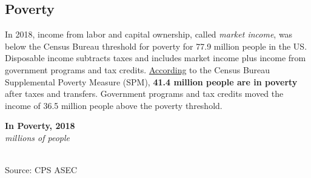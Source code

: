 \documentclass{report}
\newcommand{\barylab}[2]{yticklabel style={text width=#1, align=right, 
		style={black!70}, text height=#2},}
\newcommand{\bbar}[2]{extra #1 ticks = {{#2}}, extra #1 tick labels = ,
		extra #1 tick style = {grid=major, grid style={thick, black!25}},}
\newcommand{\barplotnogrid}{xbar=0pt, axis line style={draw=none},
	    yticklabel style={align=left, anchor=east},
      		xmajorticks=false, ymajorgrids=false,   
	    ytick=data, tickwidth=0pt, area legend, reverse legend,
	    nodes near coords, nodes near coords align={horizontal},}
\begin{document}
{{{\subsection*{\color{black!70} \seriffont Poverty}
\begin{minipage}{0.46\textwidth}
\small
In 2018, income from labor and capital ownership, called \textit{market income}, was below the Census Bureau threshold for poverty for 77.9 million people in the US. Disposable income subtracts taxes and includes market income plus income from government programs and tax credits. \href{https://www.census.gov/library/publications/2019/demo/p60-268.html}{According} to the Census Bureau Supplemental Poverty Measure (SPM), \textbf{41.4 million people are in poverty} after taxes and transfers. Government programs and tax credits moved the income of 36.5 million people above the poverty threshold.
\end{minipage} \hspace{6mm}
\begin{minipage}{0.22\textwidth}
\noindent \normalsize \textbf{In Poverty, 2018}\\
\footnotesize{\textit{millions of people}}\\ 
  \noindent \hspace*{-4mm} \\
\footnotesize{Source: CPS ASEC}\\
\end{minipage}
\vspace{1mm}

}}}
\end{document}
